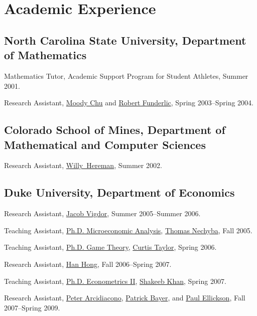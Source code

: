 \documentclass[letterpaper]{article}
\renewenvironment{itemize}{
  \begin{list}{}{
    \setlength{\leftmargin}{1em}
  }
}{
  \end{list}
}
\begin{document}
\section*{Academic Experience}

\subsection*{North Carolina State University,
  Department of Mathematics}

\begin{itemize}
\item Mathematics Tutor, Academic Support Program for Student Athletes,
  Summer 2001.
\item Research Assistant,
  \href{http://www4.ncsu.edu/~mtchu/}{Moody Chu} and
  \href{http://www4.ncsu.edu/~ref/}{Robert Funderlic},
  Spring 2003--Spring 2004.
\end{itemize}

\subsection*{Colorado School of Mines,
  Department of Mathematical and Computer Sciences}

\begin{itemize}
\item Research Assistant,
  \href{http://www.mines.edu/fs_home/whereman/}{Willy\ Hereman},
  Summer 2002.
\end{itemize}

\subsection*{Duke University, Department of Economics}

\begin{itemize}
\item Research Assistant,
  \href{http://trinity.aas.duke.edu/~jvigdor/}{Jacob Vigdor},
  Summer 2005--Summer 2006.
\item Teaching Assistant,
  \href{http://jblevins.org/courses/econ301f05}{Ph.D. Microeconomic Analysis},
  \href{http://www.econ.duke.edu/~nechyba/}{Thomas Nechyba},
  Fall 2005.
\item Teaching Assistant,
  \href{http://jblevins.org/courses/econ302s06}{Ph.D. Game Theory},
  \href{http://www.duke.edu/~crtaylor/}{Curtis Taylor},
  Spring 2006.
\item Research Assistant,
  \href{http://www.stanford.edu/~doubleh/}{Han Hong},
  Fall 2006--Spring 2007.
\item Teaching Assistant,
  \href{http://jblevins.org/courses/econ342s07}{Ph.D. Econometrics II},
  \href{http://www.econ.duke.edu/~shakeebk/}{Shakeeb Khan},
  Spring 2007.
\item Research Assistant,
  \href{http://www.econ.duke.edu/~psarcidi/}{Peter Arcidiacono},
  \href{http://www.econ.duke.edu/~pb29/}{Patrick Bayer}, and
  \href{http://www.econ.duke.edu/~paule/}{Paul Ellickson},
  Fall 2007--Spring 2009.
\end{itemize}
\end{document}
